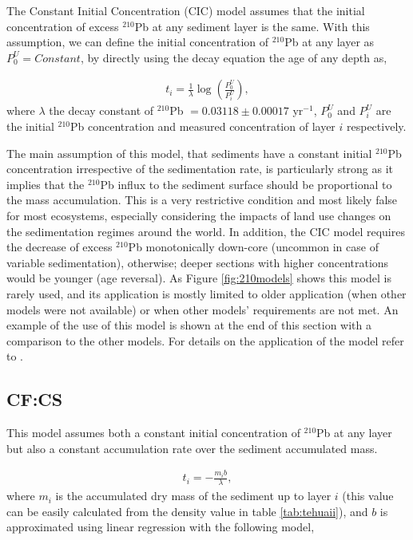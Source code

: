 \documentclass [10pt] {article}
\begin{document}
The Constant Initial Concentration (CIC) model \citep{Goldberg1963,Crozaz1964,Robbins1978} assumes that the initial concentration of excess $^{210}$Pb at any sediment layer is the same. 
With this assumption, we can define the initial concentration of $^{210}$Pb at any layer as $P_0^U = Constant$, by directly using the decay equation the age of any depth as,

\begin{eqnarray}
	t_i = \frac{1}{\lambda}\log \left( \frac{P_0^U}{P_i^U}\right),
\end{eqnarray}
where $\lambda$ the decay constant of $^{210}$Pb $= 0.03118\pm 0.00017$ yr$^{-1}$, $P_0^U$ and $P_i^U$ are the initial $^{210}$Pb concentration and measured concentration of layer $i$ respectively. 

The main assumption of this model, that sediments have a constant initial $^{210}$Pb concentration irrespective of the sedimentation rate, is particularly strong as it implies that the $^{210}$Pb influx to the sediment surface should be proportional to the mass accumulation. 
This is a very restrictive condition and most likely false for most ecosystems, especially considering the impacts of land use changes on the sedimentation regimes around the world. 
In addition, the CIC model requires the decrease of excess $^{210}$Pb monotonically down-core (uncommon in case of variable sedimentation), otherwise; deeper sections with higher concentrations would be younger (age reversal).
As Figure \ref{fig:210models} shows this model is rarely used, and its application is mostly limited to older application (when other models were not available) or when other models’ requirements are not met.
An example of the use of this model is shown at the end of this section with a comparison to the other models. For details on the application of the model refer to \citet{Sanchez-Cabeza2012}.


\subsection{CF:CS}

This model assumes both a constant initial concentration of $^{210}$Pb at any layer but also a constant accumulation rate over the sediment accumulated mass.  

\begin{eqnarray}
	t_i = -\frac{m_i b}{\lambda},
\end{eqnarray}
where $m_i$ is the accumulated dry mass of the sediment up to layer $i$ (this value can be easily calculated from the density value in table \ref{tab:tehuaii}), and $b$ is approximated using linear regression with the following model,
\end{document}
